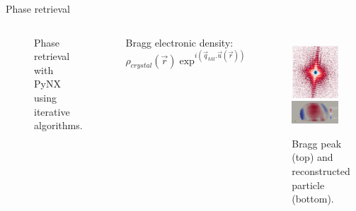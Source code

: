 \begin{frame}{Phase retrieval}
    \begin{columns}

        \begin{figure}
            \centering
            \caption{Phase retrieval with PyNX using iterative algorithms. \footnotemark}
            \label{fig:pr_pynx}
        \end{figure}

        Bragg electronic density:
        \begin{equation*}
            \rho_{crystal}(\Vec{r}) \exp^{i(\Vec{q}_{hkl}.\Vec{u}
            (\Vec{r}))}
        \end{equation*}

    
        \begin{figure}
            \centering
            \includegraphics[width=0.8\textwidth]{Figures/gwaihir/dp_pr.png}
            \pause
            \includegraphics[width=0.8\textwidth]{Figures/gwaihir/obj_pr.png}
            \caption{Bragg peak (top) and reconstructed particle (bottom).}
            \label{fig:pr_dp_particle}
        \end{figure}

    \end{columns}

\end{frame}


